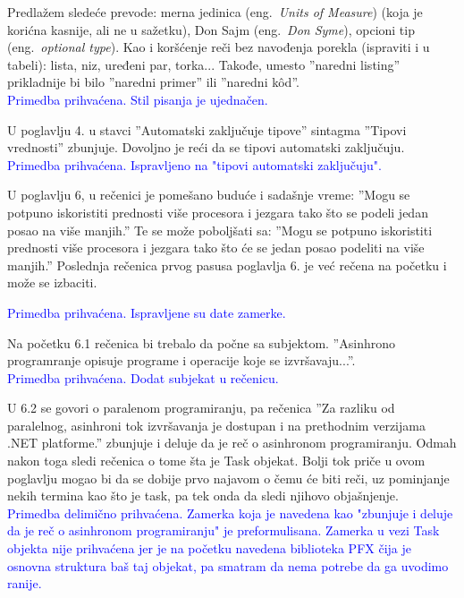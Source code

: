 \documentclass[a4paper]{report}
\newcommand{\odgovor}[1]{\textcolor{blue}{#1}}
\begin{document}
Predlažem sledeće prevode: merna jedinica (eng.~{\em Units of Measure}) 
(koja je korićna kasnije, ali ne u sažetku),
Don Sajm (eng.~{\em Don Syme}), opcioni tip (eng.~{\em optional type}).
Kao i koršćenje reči bez navođenja porekla (ispraviti i u tabeli): 
lista, niz, uređeni par, torka...
Takođe, umesto ''naredni listing'' prikladnije bi bilo ''naredni primer'' 
ili ''naredni k\^ od''. \\

\odgovor {Primedba prihvaćena. Stil pisanja je ujednačen.}

U poglavlju 4. u stavci ''Automatski zaključuje tipove'' sintagma ''Tipovi vrednosti''
zbunjuje. Dovoljno je reći da se tipovi automatski zaključuju. \\

\odgovor {Primedba prihvaćena. Ispravljeno na "tipovi automatski zaključuju".}

U poglavlju 6, u rečenici je pomešano buduće i sadašnje vreme:
''Mogu se potpuno iskoristiti prednosti više procesora i jezgara tako što se
podeli jedan posao na više manjih.'' Te se može poboljšati sa:
''Mogu se potpuno iskoristiti prednosti više procesora i jezgara tako što će se
jedan posao podeliti na više manjih.'' 
Poslednja rečenica prvog pasusa poglavlja 6. je već rečena na početku i može se izbaciti.

\odgovor {Primedba prihvaćena. Ispravljene su date zamerke.}

Na početku 6.1 rečenica bi trebalo da počne sa subjektom. 
''Asinhrono programranje opisuje programe i operacije koje se izvršavaju...''.
\\ \odgovor {Primedba prihvaćena. Dodat subjekat u rečenicu.}

U 6.2 se govori o paralenom programiranju, pa rečenica ''Za razliku od paralelnog, 
asinhroni tok izvršavanja je dostupan i na prethodnim verzijama .NET platforme.''
zbunjuje i deluje da je reč o asinhronom programiranju.
Odmah nakon toga sledi rečenica o tome šta je Task objekat.
Bolji tok priče u ovom poglavlju mogao bi da se dobije prvo najavom 
o čemu će biti reči, uz pominjanje nekih termina kao što je task,
pa tek onda da sledi njihovo objašnjenje.\\

\odgovor {Primedba delimično prihvaćena. Zamerka koja je navedena kao "zbunjuje i deluje da je reč o asinhronom programiranju" je preformulisana. Zamerka u vezi Task objekta nije prihvaćena jer je na početku navedena biblioteka PFX čija je osnovna struktura baš taj objekat, pa smatram da nema potrebe da ga uvodimo ranije.}
\end{document}
